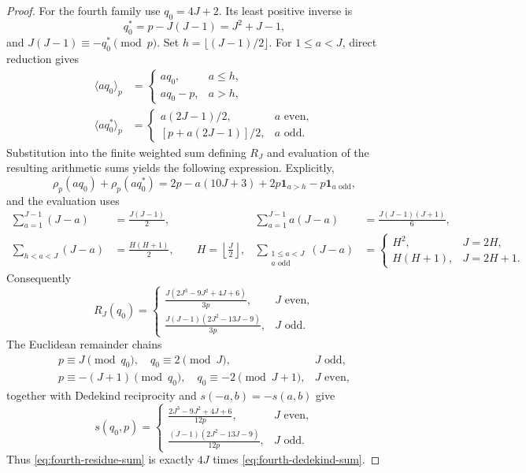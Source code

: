 \documentclass[11pt]{article}
\theoremstyle{definition}
\newcommand{\ind}{\mathbf 1}
\begin{document}
\begin{proof}
For the fourth family use $q_0=4J+2$.  Its least positive inverse is
\[
 q_0^*=p-J(J-1)=J^2+J-1,
\]
and $J(J-1)\equiv-q_0^*\pmod p$.  Set
$h=\lfloor(J-1)/2\rfloor$.  For $1\leq a<J$, direct reduction gives
\begin{align*}
 \langle aq_0\rangle_p
 &=\begin{cases}aq_0,&a\leq h,\\aq_0-p,&a>h,
   \end{cases}\\
 \langle aq_0^*\rangle_p
 &=\begin{cases}
   a(2J-1)/2,&a\text{ even},\\
   [p+a(2J-1)]/2,&a\text{ odd}.
   \end{cases}
\end{align*}
Substitution into the finite weighted sum defining $R_J$ and evaluation of
the resulting arithmetic sums yields the following expression.  Explicitly,
\[
 \rho_p(aq_0)+\rho_p(aq_0^*)
 =2p-a(10J+3)+2p\ind_{a>h}-p\ind_{a\text{ odd}},
\]
and the evaluation uses
\begin{align*}
 \sum_{a=1}^{J-1}(J-a)&=\frac{J(J-1)}2,&
 \sum_{a=1}^{J-1}a(J-a)&=\frac{J(J-1)(J+1)}6,\\
 \sum_{h<a<J}(J-a)&=\frac{H(H+1)}2,\qquad H=\left\lfloor\frac J2\right\rfloor,&
 \sum_{\substack{1\leq a<J\\a\text{ odd}}}(J-a)
 &=\begin{cases}H^2,&J=2H,\\H(H+1),&J=2H+1.\end{cases}
\end{align*}
Consequently
\begin{equation}
 R_J(q_0)=
 \begin{cases}
 \displaystyle\frac{J(2J^3-9J^2+4J+6)}{3p},&J\text{ even},\\[5pt]
 \displaystyle\frac{J(J-1)(2J^2-13J-9)}{3p},&J\text{ odd}.
 \end{cases}
 \label{eq:fourth-residue-sum}
\end{equation}
The Euclidean remainder chains
\[
 \begin{array}{ll}
 p\equiv J\pmod{q_0},\quad q_0\equiv2\pmod J,
   &J\text{ odd},\\
 p\equiv-(J+1)\pmod{q_0},\quad q_0\equiv-2\pmod{J+1},
   &J\text{ even},
 \end{array}
\]
together with Dedekind reciprocity and $s(-a,b)=-s(a,b)$ give
\begin{equation}
 s(q_0,p)=
 \begin{cases}
 \displaystyle\frac{2J^3-9J^2+4J+6}{12p},&J\text{ even},\\[5pt]
 \displaystyle\frac{(J-1)(2J^2-13J-9)}{12p},&J\text{ odd}.
 \end{cases}
 \label{eq:fourth-dedekind-sum}
\end{equation}
Thus \eqref{eq:fourth-residue-sum} is exactly $4J$ times
\eqref{eq:fourth-dedekind-sum}.


\end{proof}
\end{document}
